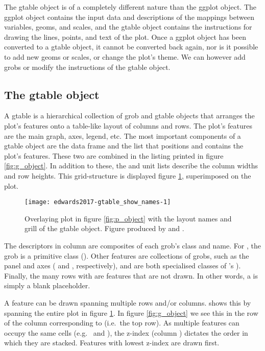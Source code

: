 The gtable object is of a completely different nature than the ggplot
object. The ggplot object contains the input data and descriptions of
the mappings between variables, geoms, and scales, and the gtable object
contains the instructions for drawing the lines, points, and text of the
plot.  Once a ggplot object has been converted to a gtable
object, it cannot be converted back again, nor is it possible to add new
geoms or scales, or change the plot's theme. We can however add grobs or
modify the instructions of the gtable object.

\subsection{The gtable object}

A gtable is a hierarchical collection of grob and gtable objects that
arranges the plot's features onto a table-like layout of columns and
rows. The plot's features are the main graph, axes, legend, etc. The
most important components of a gtable object are the  data
frame and the  list that positions and contains the plot's
features. These two are combined in the listing printed in figure
\ref{fig:g_object}. In addition to these, the  and
 unit lists describe the column widths and row heights.
This grid-structure is displayed figure \ref{fig:gtable_show_names},
superimposed on the plot.

\begin{figure}[h!]


\texttt{[image: edwards2017-gtable\_show\_names-1]} 
  \caption{
    Overlaying plot in figure \ref{fig:p_object} with the layout names and grill of the gtable object.
    Figure produced by  and .}
  \label{fig:gtable_show_names}
\end{figure}

The descriptors in column  are composites of each grob's
class and name. For , the grob is a primitive class
(). Other features are collections of grobs, such as the
panel and axes ( and ,
respectively), and are both specialised classes of 's
). Finally, the many rows with  are
features that are not drawn. In other words, a  is
simply a blank placeholder.

A feature can be drawn spanning multiple rows and/or columns.
 shows this by spanning the entire plot in figure
\ref{fig:gtable_show_names}. In figure \ref{fig:g_object} we see this in
the row of the column  corresponding to 
(i.e.~the top row). As multiple features can occupy the same cells
(e.g.~ and ), the z-index (column )
dictates the order in which they are stacked. Features with lowest
z-index are drawn first.

